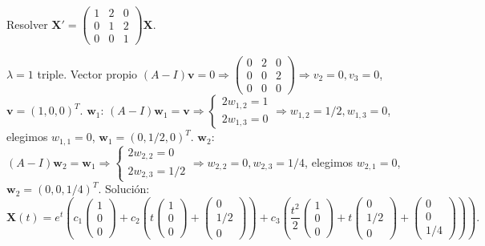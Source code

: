 \begin{prob}
Resolver $\mathbf{X}'=
\begin{pmatrix}
1&2&0\\
0&1&2\\
0&0&1
\end{pmatrix}\mathbf{X}$.
\begin{myproof}
$\lambda=1$ triple. Vector propio $(A-I)\mathbf{v}=0\Rightarrow
\begin{pmatrix}
0&2&0\\
0&0&2\\
0&0&0
\end{pmatrix}\Rightarrow v_2=0,v_3=0$, $\mathbf{v}=(1,0,0)^T$.
$\mathbf{w}_1$: $(A-I)\mathbf{w}_1=\mathbf{v}\Rightarrow
\begin{cases}
2w_{1,2}=1\\
2w_{1,3}=0
\end{cases}
\Rightarrow w_{1,2}=1/2, w_{1,3}=0$, elegimos $w_{1,1}=0$, $\mathbf{w}_1=(0,1/2,0)^T$.
$\mathbf{w}_2$: $(A-I)\mathbf{w}_2=\mathbf{w}_1\Rightarrow
\begin{cases}
2w_{2,2}=0\\
2w_{2,3}=1/2
\end{cases}
\Rightarrow w_{2,2}=0, w_{2,3}=1/4$, elegimos $w_{2,1}=0$, $\mathbf{w}_2=(0,0,1/4)^T$.
Solución:
\[
\boxed{
\mathbf{X}(t)=e^t\left(c_1
\begin{pmatrix}
1\\0\\0
\end{pmatrix}
+c_2\left(t
\begin{pmatrix}
1\\0\\0
\end{pmatrix}
+
\begin{pmatrix}
0\\1/2\\0
\end{pmatrix}\right)
+c_3\left(\frac{t^2}{2}
\begin{pmatrix}
1\\0\\0
\end{pmatrix}
+t
\begin{pmatrix}
0\\1/2\\0
\end{pmatrix}
+
\begin{pmatrix}
0\\0\\1/4
\end{pmatrix}\right)\right).
}
\]
\end{myproof}
\end{prob}

